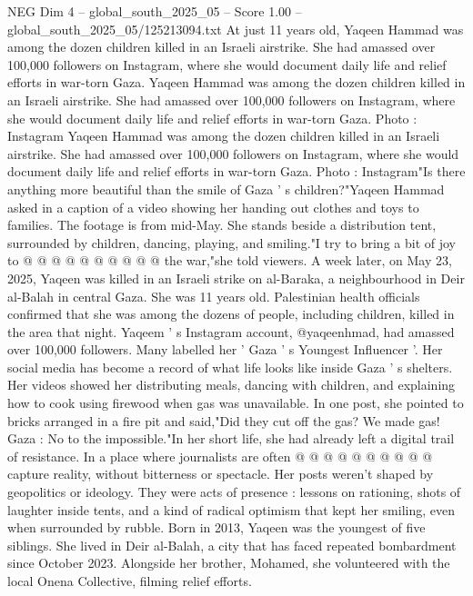 \begin{textsample}{NEG Dim 4 – global\_south\_2025\_05 – Score 1.00 – global\_south\_2025\_05/125213094.txt}  \label{ex:f4_neg_367}
At just 11 years old, Yaqeen Hammad was among the dozen children killed in an Israeli airstrike.
She had amassed over 100,000 followers on Instagram, where she would document daily life and relief efforts in war-torn Gaza.
Yaqeen Hammad was among the dozen children killed in an Israeli airstrike.
She had amassed over 100,000 followers on Instagram, where she would document daily life and relief efforts in war-torn Gaza.
Photo : Instagram Yaqeen Hammad was among the dozen children killed in an Israeli airstrike.
She had amassed over 100,000 followers on Instagram, where she would document daily life and relief efforts in war-torn Gaza.
Photo : Instagram"Is there anything more beautiful than the smile of Gaza ' s children?"Yaqeen Hammad asked in a caption of a video showing her handing out clothes and toys to families.
The footage is from mid-May.
She stands beside a distribution tent, surrounded by children, dancing, playing, and smiling."I try to bring a bit of joy to @ @ @ @ @ @ @ @ @ @ the war,"she told viewers.
A week later, on May 23, 2025, Yaqeen was killed in an Israeli strike on al-Baraka, a neighbourhood in Deir al-Balah in central Gaza.
She was 11 years old.
Palestinian health officials confirmed that she was among the dozens of people, including children, killed in the area that night.
Yaqeem ' s Instagram account, @yaqeenhmad, had amassed over 100,000 followers.
Many labelled her ' Gaza ' s Youngest Influencer '.
Her social media has become a record of what life looks like inside Gaza ' s shelters.
Her videos showed her distributing meals, dancing with children, and explaining how to cook using firewood when gas was unavailable.
In one post, she pointed to bricks arranged in a fire pit and said,"Did they cut off the gas?
We made gas!
Gaza : No to the impossible."In her short life, she had already left a digital trail of resistance.
In a place where journalists are often @ @ @ @ @ @ @ @ @ @ capture reality, without bitterness or spectacle.
Her posts weren't shaped by geopolitics or ideology.
They were acts of presence : lessons on rationing, shots of laughter inside tents, and a kind of radical optimism that kept her smiling, even when surrounded by rubble.
Born in 2013, Yaqeen was the youngest of five siblings.
She lived in Deir al-Balah, a city that has faced repeated bombardment since October 2023.
Alongside her brother, Mohamed, she volunteered with the local Onena Collective, filming relief efforts.

\end{textsample}
